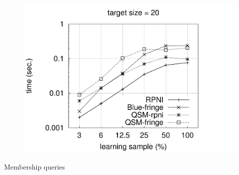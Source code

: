 \begin{figure}[H]
{  \includegraphics[trim=25mm 21mm 35mm 20mm, clip, page=19]{src/5-evaluation/images/time}
}
\end{figure}

\vspace{-0cm}
{\noindent\small\sc Membership queries}
\vspace{-0cm}

